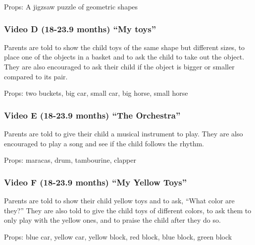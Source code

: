 \documentclass[man,floatsintext]{apa6}
\begin{document}
\begin{appendix}
Props: A jigzsaw puzzle of geometric shapes

\hypertarget{video-d-18-23.9-months-my-toys}{%
\subsubsection{Video D (18-23.9 months) ``My
toys''}\label{video-d-18-23.9-months-my-toys}}

Parents are told to show the child toys of the same shape but different
sizes, to place one of the objects in a basket and to ask the child to
take out the object. They are also encouraged to ask their child if the
object is bigger or smaller compared to its pair.

Props: two buckets, big car, small car, big horse, small horse

\hypertarget{video-e-18-23.9-months-the-orchestra}{%
\subsubsection{Video E (18-23.9 months) ``The
Orchestra''}\label{video-e-18-23.9-months-the-orchestra}}

Parents are told to give their child a musical instrument to play. They
are also encouraged to play a song and see if the child follows the
rhythm.

Props: maracas, drum, tambourine, clapper

\hypertarget{video-f-18-23.9-months-my-yellow-toys}{%
\subsubsection{Video F (18-23.9 months) ``My Yellow
Toys''}\label{video-f-18-23.9-months-my-yellow-toys}}

Parents are told to show their child yellow toys and to ask, ``What
color are they?'' They are also told to give the child toys of different
colors, to ask them to only play with the yellow ones, and to praise the
child after they do so.

Props: blue car, yellow car, yellow block, red block, blue block, green
block
\end{appendix}
\end{document}
